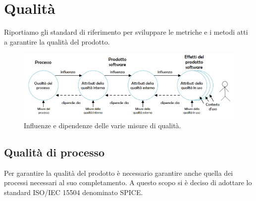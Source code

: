 \documentclass[a4paper]{article}
\begin{document}
			\section{Qualità}
Riportiamo gli standard di riferimento per sviluppare le metriche e i metodi atti a garantire la qualità del prodotto.
				\begin{figure}[H]
					\centering
					\includegraphics[scale=0.65]{immagini/Pdq/QualitaDelProdottoSoftware.PNG}
					\caption{Influenze e dipendenze delle varie misure di qualità.}
				\end{figure}
			\subsection{Qualità di processo}
				Per garantire la qualità del prodotto è necessario garantire anche quella dei processi necessari 
				al suo completamento. A questo scopo si è deciso di adottare lo standard 
				ISO/IEC 15504 denominato SPICE.
				
\end{document}
